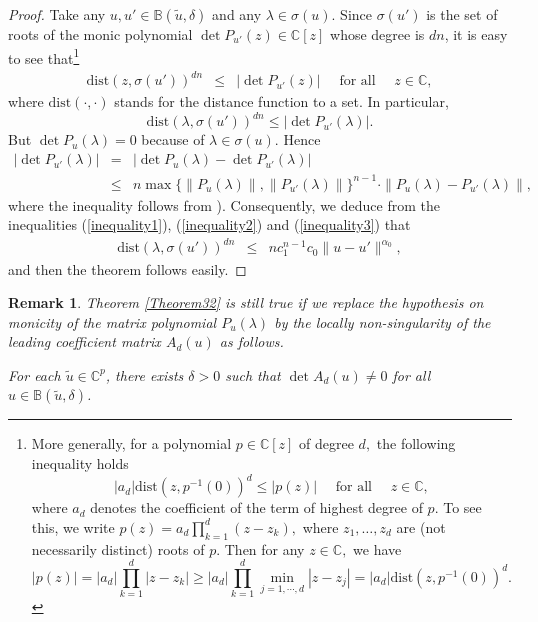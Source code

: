 \documentclass[10pt,reqno]{amsart}
\theoremstyle{break-italic}
\theoremstyle{break-italic}
\theoremstyle{break-italic}
\theoremstyle{break-italic}
\theoremstyle{break-italic}
\theoremstyle{break-italic}
\theoremstyle{break-italic}
\theoremstyle{break-italic}
\theoremstyle{break-roman}
\newtheorem{remark}[satz]{Remark}
\theoremstyle{standard}
\theoremstyle{varthm-roman}
\theoremstyle{varthm-italic}
\theoremstyle{varthm-roman-break}
\theoremstyle{varthm-italic-break}
\theoremstyle{varthm-roman-no-punctuation}
\theoremstyle{varthm-italic-no-punctuation}
\numberwithin{equation}{section}
\begin{document}
\begin{proof}
Take any $u, u' \in \mathbb{B}(\tilde{u}, \delta)$ and any $\lambda \in \sigma(u).$ Since $\sigma(u')$ is the set of roots of the monic polynomial $\det P_{u'}(z) \in \mathbb C[z]$ whose degree is $dn$, it is easy to see that\footnote{More generally, for a polynomial $p\in \mathbb C[z]$ of degree $d,$ the following inequality holds
$$  |a_d|\mathrm{dist}(z, p^{-1}(0))^{d}\leq  |p(z)| \quad \textrm{ for all } \quad z \in \mathbb C, $$
where $a_d$ denotes the coefficient of the term of highest degree of $p.$ To see this, we write
$p(z) = a_d \prod_{k = 1}^d (z - z_k),$ where $z_1, \ldots, z_d$ are (not necessarily distinct) roots of $p.$ Then for any $z\in \mathbb C,$ we have
$$ |p(z)| = |a_d| \prod_{k = 1}^d |z - z_k| \geq |a_d| \prod_{k = 1}^d \min_{j = 1, \cdots, d} |z - z_j| = |a_d| \mathrm{dist}(z, p^{-1}(0))^d. $$}
\begin{eqnarray*}
\mathrm{dist}(z, \sigma(u'))^{dn} & \leq & |\det P_{u'}(z)| \quad \textrm{ for all } \quad z \in \mathbb C,
\end{eqnarray*}
where $\mathrm{dist}(\cdot, \cdot)$ stands for the distance function to a set. In particular,
\begin{equation} \label{inequality3}
 \mathrm{dist}(\lambda, \sigma(u'))^{dn} \leq |\det P_{u'}(\lambda)|.
 \end{equation}
But $\det P_{u}(\lambda) = 0$ because of $\lambda \in \sigma(u).$ Hence
\begin{eqnarray*}
|\det P_{u'}(\lambda)|
& = & |\det P_{u}(\lambda) - \det P_{u'}(\lambda)| \\
& \leq & n \max\{  \|P_{u}(\lambda)\|, \|P_{u'}(\lambda)\|\}^{n - 1}\cdot \|P_{u}(\lambda) - P_{ u'}(\lambda)\|,
\end{eqnarray*}
where the inequality follows from \cite[Corollary~20.2]{Bhatia2007}). Consequently, we deduce from the inequalities (\ref{inequality1}), (\ref{inequality2}) and (\ref{inequality3}) that
\begin{eqnarray*}
\mathrm{dist}(\lambda, \sigma(u'))^{dn} & \leq & n c_1^{n - 1} c_0 \|u - u'\|^{\alpha_0},
\end{eqnarray*}
and then the theorem follows easily.
\end{proof}

\begin{remark} \label{rem:theorem32} \rm Theorem \ref{Theorem32} is still true if we replace the hypothesis on monicity of the matrix polynomial $P_u(\lambda)$ by the locally non-singularity of the leading coefficient matrix $A_d(u)$ as follows.

\textit{For each $\tilde{u}\in \mathbb C^p$, there exists $\delta > 0$ such that $\det A_d(u) \neq 0$ 
for all $u \in \mathbb B(\tilde{u}, \delta)$.}

\end{remark}
\end{document}
